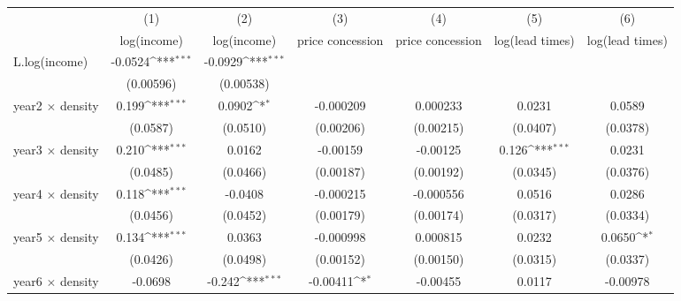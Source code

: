 {
\def\sym#1{\ifmmode^{#1}\else\(^{#1}\)\fi}
\begin{tabular}{l*{6}{c}}
\toprule
            &\multicolumn{1}{c}{(1)}&\multicolumn{1}{c}{(2)}&\multicolumn{1}{c}{(3)}&\multicolumn{1}{c}{(4)}&\multicolumn{1}{c}{(5)}&\multicolumn{1}{c}{(6)}\\
            &\multicolumn{1}{c}{log(income)}&\multicolumn{1}{c}{log(income)}&\multicolumn{1}{c}{price concession}&\multicolumn{1}{c}{price concession}&\multicolumn{1}{c}{log(lead times)}&\multicolumn{1}{c}{log(lead times)}\\
\midrule
L.log(income) &     -0.0524\sym{***}&     -0.0929\sym{***}&                     &                     &                     &                     \\
            &   (0.00596)         &   (0.00538)         &                     &                     &                     &                     \\
\addlinespace
year2 $\times$ density&       0.199\sym{***}&      0.0902\sym{*}  &   -0.000209         &    0.000233         &      0.0231         &      0.0589         \\
            &    (0.0587)         &    (0.0510)         &   (0.00206)         &   (0.00215)         &    (0.0407)         &    (0.0378)         \\
\addlinespace
year3 $\times$ density&       0.210\sym{***}&      0.0162         &    -0.00159         &    -0.00125         &       0.126\sym{***}&      0.0231         \\
            &    (0.0485)         &    (0.0466)         &   (0.00187)         &   (0.00192)         &    (0.0345)         &    (0.0376)         \\
\addlinespace
year4 $\times$ density&       0.118\sym{***}&     -0.0408         &   -0.000215         &   -0.000556         &      0.0516         &      0.0286         \\
            &    (0.0456)         &    (0.0452)         &   (0.00179)         &   (0.00174)         &    (0.0317)         &    (0.0334)         \\
\addlinespace
year5 $\times$ density&       0.134\sym{***}&      0.0363         &   -0.000998         &    0.000815         &      0.0232         &      0.0650\sym{*}  \\
            &    (0.0426)         &    (0.0498)         &   (0.00152)         &   (0.00150)         &    (0.0315)         &    (0.0337)         \\
\addlinespace
year6 $\times$ density&     -0.0698         &      -0.242\sym{***}&    -0.00411\sym{*}  &    -0.00455         &      0.0117         &    -0.00978         \\

\end{tabular}}
